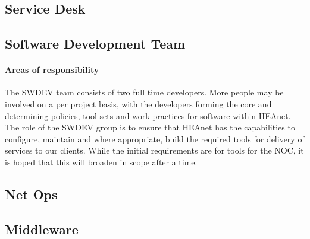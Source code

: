 \documentclass{article}
\begin{document}
\subsection{Service Desk}
\subsection{Software Development Team}
\paragraph{Areas of responsibility \newline}
The SWDEV team consists of two full time developers.
More people may be involved on a per project basis, with the developers forming the core and determining policies, tool sets and work practices for software within HEAnet.
The role of the SWDEV group is to ensure that HEAnet has the capabilities to configure, maintain and where appropriate, build the required tools for delivery of services to our clients. While the initial requirements are for tools for the NOC, it is hoped that this will broaden in scope after a time.
\subsection{Net Ops}
\subsection{Middleware}
\end{document}
